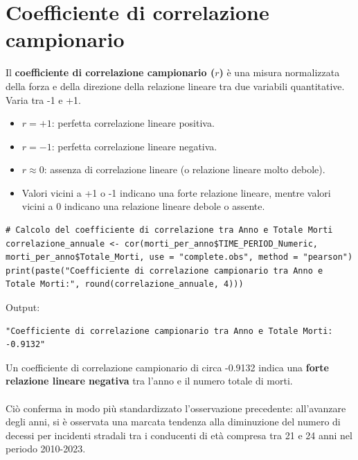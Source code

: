 \documentclass[14pt, openany, titlepage]{report} %
\begin{document}
\section{Coefficiente di correlazione campionario}
Il \textbf{coefficiente di correlazione campionario ($r$)} è una misura normalizzata della forza 
e della direzione della relazione lineare tra due variabili quantitative. Varia tra -1 e +1.
\begin{itemize}
    \item $r = +1$: perfetta correlazione lineare positiva.
    \item $r = -1$: perfetta correlazione lineare negativa.
    \item $r \approx 0$: assenza di correlazione lineare (o relazione lineare molto debole).
    \item Valori vicini a +1 o -1 indicano una forte relazione lineare, mentre valori vicini a 0 indicano una relazione lineare debole o assente.
\end{itemize}

\begin{center}
\begin{lstlisting}[breaklines=true]
# Calcolo del coefficiente di correlazione tra Anno e Totale Morti
correlazione_annuale <- cor(morti_per_anno$TIME_PERIOD_Numeric, morti_per_anno$Totale_Morti, use = "complete.obs", method = "pearson")
print(paste("Coefficiente di correlazione campionario tra Anno e Totale Morti:", round(correlazione_annuale, 4)))
\end{lstlisting}
\end{center}

\noindent
Output:
\begin{verbatim}
"Coefficiente di correlazione campionario tra Anno e Totale Morti: -0.9132"
\end{verbatim}
\noindent
Un coefficiente di correlazione campionario di circa -0.9132 indica una \textbf{forte relazione lineare negativa} tra l'anno e il numero totale di morti. \\\\
\noindent
Ciò conferma in modo più standardizzato l'osservazione precedente: all'avanzare degli anni, si è osservata una marcata tendenza alla diminuzione del numero di decessi per incidenti stradali tra i conducenti di età compresa tra 21 e 24 anni nel periodo 2010-2023.
\end{document}

